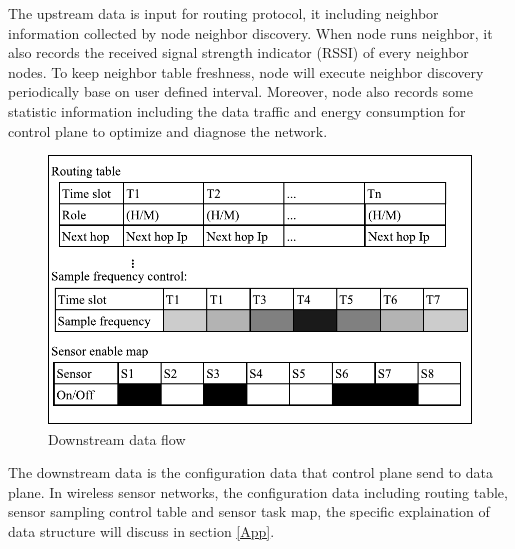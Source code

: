 The upstream data is input for routing protocol, it including neighbor information collected by node neighbor discovery. 
When node runs neighbor, it also records the received signal strength indicator (RSSI) of every neighbor nodes. To keep neighbor table freshness, 
node will execute neighbor discovery periodically base on user defined interval.
Moreover, node also records some statistic information including the data traffic and energy consumption for control plane to optimize and diagnose the network.

\begin{figure}[htbp]
	\centering
	\includegraphics[width=.7\columnwidth]{Figure/downstream}
	\caption{Downstream data flow}
	\label{downstream}
\end{figure}

The downstream data is the configuration data that control plane send to data plane. In wireless sensor networks, 
the configuration data including routing table, sensor sampling control table and sensor task map, the specific explaination of data structure will discuss in section \ref{App}.

